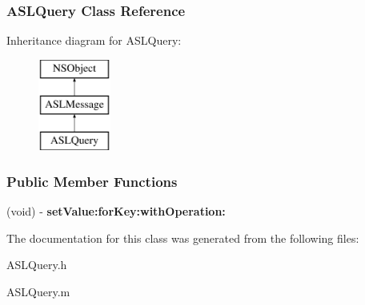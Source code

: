 \hypertarget{interface_a_s_l_query}{
\subsubsection{ASLQuery Class Reference}
\label{interface_a_s_l_query}
}
Inheritance diagram for ASLQuery:\begin{figure}[h]
\begin{center}
\leavevmode
\includegraphics[height=3.000000cm]{interface_a_s_l_query}
\end{center}
\end{figure}
\subsubsection*{Public Member Functions}
\begin{DoxyCompactItemize}
\item 
\hypertarget{interface_a_s_l_query_a286607b7d9864bf69318732cbda9b415}{
(void) -\/ {\bfseries setValue:forKey:withOperation:}}
\label{interface_a_s_l_query_a286607b7d9864bf69318732cbda9b415}

\end{DoxyCompactItemize}


The documentation for this class was generated from the following files:\begin{DoxyCompactItemize}
\item 
ASLQuery.h\item 
ASLQuery.m\end{DoxyCompactItemize}
